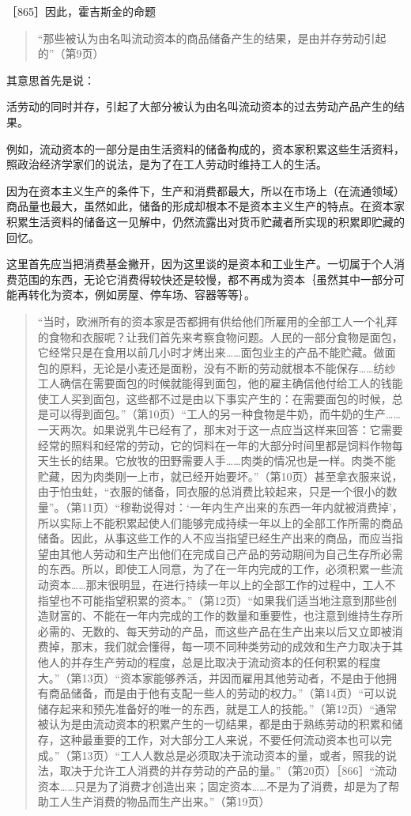 ［865］因此，霍吉斯金的命题

\begin{quote}{“那些被认为由名叫流动资本的商品储备产生的结果，是由并存劳动引起的”（第9页）}\end{quote}

其意思首先是说：

活劳动的同时并存，引起了大部分被认为由名叫流动资本的过去劳动产品产生的结果。

例如，流动资本的一部分是由生活资料的储备构成的，资本家积累这些生活资料，照政治经济学家们的说法，是为了在工人劳动时维持工人的生活。

因为在资本主义生产的条件下，生产和消费都最大，所以在市场上（在流通领域）商品量也最大，虽然如此，储备的形成却根本不是资本主义生产的特点。在资本家积累生活资料的储备这一见解中，仍然流露出对货币贮藏者所实现的积累即贮藏的回忆。

这里首先应当把消费基金撇开，因为这里谈的是资本和工业生产。一切属于个人消费范围的东西，无论它消费得较快还是较慢，都不再成为资本｛虽然其中一部分可能再转化为资本，例如房屋、停车场、容器等等｝。

\begin{quote}{“当时，欧洲所有的资本家是否都拥有供给他们所雇用的全部工人一个礼拜的食物和衣服呢？让我们首先来考察食物问题。人民的一部分食物是面包，它经常只是在食用以前几小时才烤出来……面包业主的产品不能贮藏。做面包的原料，无论是小麦还是面粉，没有不断的劳动就根本不能保存……纺纱工人确信在需要面包的时候就能得到面包，他的雇主确信他付给工人的钱能使工人买到面包，这些都不过是由以下事实产生的：在需要面包的时候，总是可以得到面包。”（第10页）“工人的另一种食物是牛奶，而牛奶的生产……一天两次。如果说乳牛已经有了，那末对于这一点应当这样来回答：它需要经常的照料和经常的劳动，它的饲料在一年的大部分时间里都是饲料作物每天生长的结果。它放牧的田野需要人手……肉类的情况也是一样。肉类不能贮藏，因为肉类刚一上市，就已经开始要坏。”（第10页）甚至拿衣服来说，由于怕虫蛀，“衣服的储备，同衣服的总消费比较起来，只是一个很小的数量”。（第11页）“穆勒说得对：‘一年内生产出来的东西一年内就被消费掉’，所以实际上不能积累起使人们能够完成持续一年以上的全部工作所需的商品储备。因此，从事这些工作的人不应当指望已经生产出来的商品，而应当指望由其他人劳动和生产出他们在完成自己产品的劳动期间为自己生存所必需的东西。所以，即使工人同意，为了在一年内完成的工作，必须积累一些流动资本……那末很明显，在进行持续一年以上的全部工作的过程中，工人不指望也不可能指望积累的资本。”（第12页）“如果我们适当地注意到那些创造财富的、不能在一年内完成的工作的数量和重要性，也注意到维持生存所必需的、无数的、每天劳动的产品，而这些产品在生产出来以后又立即被消费掉，那末，我们就会懂得，每一项不同种类劳动的成效和生产力取决于其他人的并存生产劳动的程度，总是比取决于流动资本的任何积累的程度大。”（第13页）“资本家能够养活，并因而雇用其他劳动者，不是由于他拥有商品储备，而是由于他有支配一些人的劳动的权力。”（第14页）“可以说储存起来和预先准备好的唯一的东西，就是工人的技能。”（第12页）“通常被认为是由流动资本的积累产生的一切结果，都是由于熟练劳动的积累和储存，这种最重要的工作，对大部分工人来说，不要任何流动资本也可以完成。”（第13页）“工人人数总是必须取决于流动资本的量，或者，照我的说法，取决于允许工人消费的并存劳动的产品的量。”（第20页）［866］“流动资本……只是为了消费才创造出来；固定资本……不是为了消费，却是为了帮助工人生产消费的物品而生产出来。”（第19页）}\end{quote}

